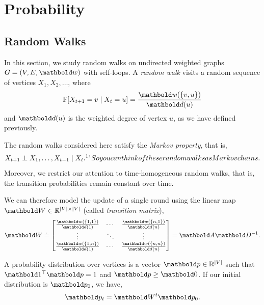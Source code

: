 
\chapter{Probability}

\section{Random Walks}

In this section, we study random walks on undirected weighted graphs $G = (\sV, \sE, \vw)$ with self-loops. A \emph{random walk} visits a random sequence of vertices $X_1, X_2, \dots$, where \begin{align}
    \Pr{X_{t+1} = v \mid X_t = u} = \frac{\vw(\{v, u\})}{\vd(u)}
\end{align} and $\vd(u)$ is the weighted degree of vertex $u$, as we have defined previously.

\begin{rmk}
The random walks considered here satisfy the \emph{Markov property}, that is, \begin{align}
    X_{t+1} \perp X_1, \dots, X_{t-1} \mid X_t.\safefootnote{So you can think of these random walks as Markov chains.}
\end{align} Moreover, we restrict our attention to time-homogeneous random walks, that is, the transition probabilities remain constant over time.
\end{rmk}

We can therefore model the update of a single round using the linear map $\mW \in \R^{|\sV|\times|\sV|}$ (called \emph{transition matrix}), \begin{align}
    \mW \defeq \begin{bmatrix}
    \frac{\vw(\{1,1\})}{\vd(1)} & \cdots & \frac{\vw(\{n, 1\})}{\vd(n)} \\
    \vdots & \ddots & \vdots \\
    \frac{\vw(\{1,n\})}{\vd(1)} & \cdots & \frac{\vw(\{n, n\})}{\vd(n)} \\
    \end{bmatrix} = \mA\inv{\mD}.
\end{align}

A probability distribution over vertices is a vector $\vp \in \R^{|\sV|}$ such that $\trans{\vOne}\vp = 1$ and $\vp \geq \vZero$. If our initial distribution is $\vp_0$, we have, \begin{align}
    \vp_t = \mW^t\vp_0.
\end{align}

